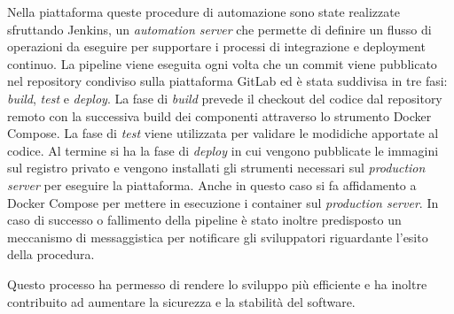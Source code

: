 Nella piattaforma queste procedure di automazione sono state realizzate sfruttando Jenkins, un \textit{automation server}
che permette di definire un flusso di operazioni da eseguire per supportare i processi di integrazione e deployment continuo.
La pipeline viene eseguita ogni volta che un commit viene pubblicato nel repository condiviso sulla piattaforma GitLab ed
è stata suddivisa in tre fasi: \textit{build}, \textit{test} e \textit{deploy}.
La fase di \textit{build} prevede il checkout del codice dal repository remoto con la successiva build dei componenti attraverso lo strumento Docker Compose.
La fase di \textit{test} viene utilizzata per validare le modidiche apportate al codice. Al termine si ha la fase di \textit{deploy} in cui vengono pubblicate
le immagini sul registro privato e vengono installati gli strumenti necessari sul \textit{production server} per eseguire la piattaforma. Anche in questo caso si fa
affidamento a Docker Compose per mettere in esecuzione i container sul \textit{production server}.
In caso di successo o fallimento della pipeline è stato inoltre predisposto un meccanismo di messaggistica per notificare
gli sviluppatori riguardante l'esito della procedura.

Questo processo ha permesso di rendere lo sviluppo più efficiente e ha inoltre contribuito ad aumentare
la sicurezza e la stabilità del software.
